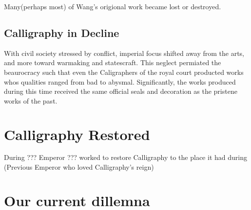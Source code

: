 Many(perhaps most) of Wang's origional work became lost or destroyed.

\subsection{Calligraphy in Decline}

With civil society stressed by conflict, imperial focus shifted away from the arts, and more toward warmaking and statescraft.  This neglect permiated the beaurocracy such that even the Caligraphers of the royal court producted works whos qualities ranged from bad to abysmal.  Significantly, the works produced during this time received the same official seals and decoration as the pristene works of the past.

\section{Calligraphy Restored}

During ??? Emperor ??? worked to restore Calligraphy to the place it had during (Previous Emperor who loved Calligraphy's reign)


\section{Our current dillemna}




